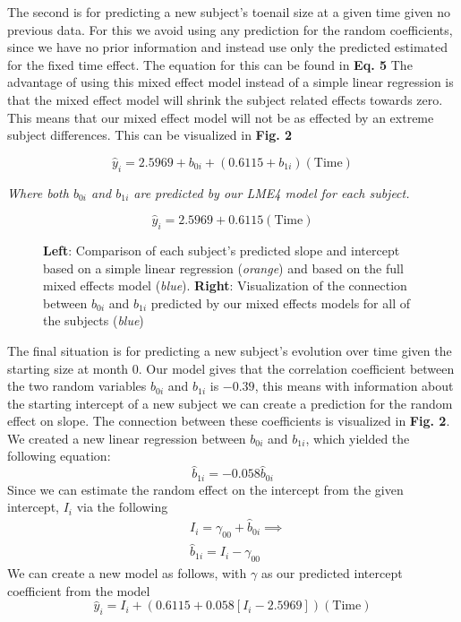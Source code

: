 \documentclass{article}
\begin{document}
The second is for predicting a new subject's toenail size at a given time given no previous data. For this we avoid using any prediction for the random coefficients, since we have no prior information and instead use only the predicted estimated for the fixed time effect. The equation for this can be found in \textbf{Eq. 5} The advantage of using this mixed effect model instead of a simple linear regression is that the mixed effect model will shrink the subject related effects towards zero. This means that our mixed effect model will not be as effected by an extreme subject differences. This can be visualized in \textbf{Fig. 2}

\begin{equation}
    \hat{y}_{i} = 2.5969 + b_{0i} + (0.6115 + b_{1i})(\textrm{Time}) 
\end{equation}
\begin{center}
    \textit{Where both $b_{0i}$ and $b_{1i}$ are predicted by our LME4 model for each subject.}
\end{center}

\hspace{10mm} 

\begin{equation}
    \hat{y}_{i} = 2.5969 + 0.6115(\textrm{Time})
\end{equation}

\begin{figure}[H]

\centering
\caption{\textbf{Left}: Comparison of each subject's predicted slope and intercept based on a simple linear regression (\textit{orange}) and based on the full mixed effects model (\textit{blue}). \textbf{Right}: Visualization of the connection between $b_{0i}$ and $b_{1i}$ predicted by our mixed effects models for all of the subjects (\textit{blue})}
\end{figure}

\hspace{10mm} The final situation is for predicting a new subject's evolution over time given the starting size at month 0. Our model gives that the correlation coefficient between the two random variables $b_{0i}$ and $b_{1i}$ is $-0.39$, this means with information about the starting intercept of a new subject we can create a prediction for the random effect on slope. The connection between these coefficients is visualized in \textbf{Fig. 2}. We created a new linear regression between $b_{0i}$ and $b_{1i}$, which yielded the following equation:
\begin{equation*}
    \hat{b}_{1i} = -0.058\hat{b}_{0i}
\end{equation*}
Since we can estimate the random effect on the intercept from the given intercept, $I_i$ via the following
\begin{align*}
    & I_{i} = \gamma_{00} + \hat{b}_{0i} \implies\\
    & \hat{b}_{1i} = I_{i} - \gamma_{00}
\end{align*}
We can create a new model as follows, with $\gamma$ as our predicted intercept coefficient from the model
\begin{equation}
    \hat{y}_i = I_i +(0.6115 + 0.058[I_i - 2.5969])(\textrm{Time})
\end{equation}
\end{document}
